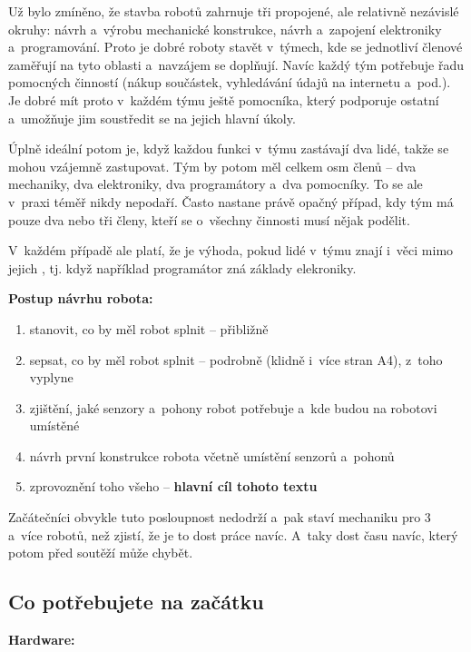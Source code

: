 Už bylo zmíněno, že stavba robotů zahrnuje tři propojené, ale relativně nezávislé okruhy: návrh a~výrobu mechanické konstrukce, návrh a~zapojení elektroniky a~programování.
Proto je dobré roboty stavět v~týmech, kde se jednotliví členové zaměřují na tyto oblasti a~navzájem se doplňují.
Navíc každý tým potřebuje řadu pomocných činností (nákup součástek, vyhledávání údajů na internetu a~pod.).
Je dobré mít proto v~každém týmu ještě pomocníka, který podporuje ostatní a~umožňuje jim soustředit se na jejich hlavní úkoly.

Úplně ideální potom je, když každou funkci v~týmu zastávají dva lidé, takže se mohou vzájemně zastupovat.
Tým by potom měl celkem osm členů -- dva mechaniky, dva elektroniky, dva programátory a~dva pomocníky.
To se ale v~praxi téměř nikdy nepodaří.
Často nastane právě opačný případ, kdy tým má pouze dva nebo tři členy, kteří se o~všechny činnosti musí nějak podělit.

V~každém případě ale platí, že je výhoda, pokud lidé v~týmu znají i~věci mimo jejich , tj. když například programátor zná základy elekroniky.

{\bf Postup návrhu robota: }
\begin{enumerate} %
\item  stanovit, co by měl robot splnit -- přibližně 
\item  sepsat, co by měl robot splnit -- podrobně (klidně i~více stran A4), z~toho vyplyne
\item  zjištění, jaké senzory a~pohony robot potřebuje a~kde budou na robotovi umístěné
\item  návrh první konstrukce robota včetně umístění senzorů a~pohonů
\item  zprovoznění toho všeho -- {\bf hlavní cíl tohoto textu }
\end{enumerate}

Začátečníci obvykle tuto posloupnost nedodrží a~pak staví mechaniku pro 3 a~více robotů, než zjistí, že je to dost práce navíc.
A~taky dost času navíc, který potom před soutěží může chybět. 



\subsection{Co potřebujete na začátku}

{\bf Hardware: }


